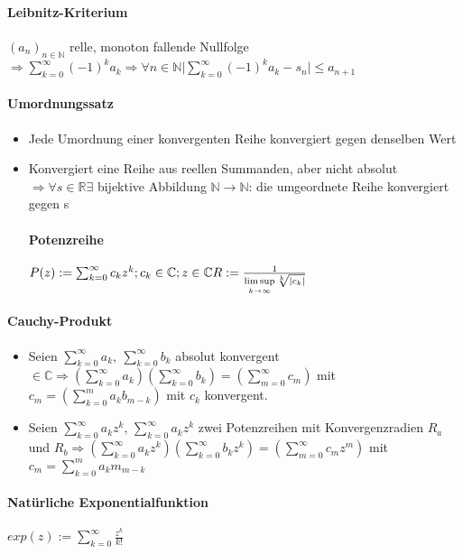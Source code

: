 \documentclass[paper=a4,paper=landscape, fontsize=6pt,DIV=25, twoside]{scrartcl}
\newcommand{\real}{{\mathbb{R}}}
\newcommand{\compl}{\mathbb{C}}
\newcommand{\nat}{\mathbb{N}}
\newcommand{\aseq}{(a_n)_{n \in \nat}}
\begin{document}
\begin{multicols*}{4}
		\paragraph{Leibnitz-Kriterium}
		$\aseq$ relle, monoton fallende Nullfolge $ \Rightarrow \sum_{k=0}^{\infty} (-1)^ka_k \Rightarrow \forall n \in \nat \lvert \sum_{k=0}^{\infty}(-1)^ka_k-s_n \rvert \leq  a_{n+1}$
		\paragraph{Umordnungssatz}\begin{itemize}[noitemsep,nolistsep]
			\item Jede Umordnung einer konvergenten Reihe konvergiert gegen denselben Wert
			\item Konvergiert eine Reihe aus reellen Summanden, aber nicht absolut $\Rightarrow \forall s \in \real \exists$ bijektive Abbildung $\nat \rightarrow \nat$: die umgeordnete Reihe konvergiert gegen s
		\paragraph{Potenzreihe}
		$ P(z) := \sum_{k=0}^{\infty} c_kz^k; c_k \in \compl; z \in \compl\\R := \frac{1}{\limsup\limits_{k \rightarrow \infty} \sqrt[k]{|c_k|}}$
		\end{itemize}
		\paragraph{Cauchy-Produkt}
		\begin{itemize}[noitemsep,nolistsep]
			\item Seien $ \sum_{k=0}^{\infty} a_k,\:\sum_{k=0}^{\infty} b_k$ absolut konvergent $ \in \compl \Rightarrow (\sum_{k=0}^{\infty} a_k) (\sum_{k=0}^{\infty} b_k) = (\sum_{m=0}^{\infty} c_m)$ mit $ c_m=(\sum_{k=0}^{m} a_kb_{m-k})$ mit $c_k$ konvergent.
			\item Seien $ \sum_{k=0}^{\infty} a_kz^k$, $\sum_{k=0}^{\infty} a_kz^k$ zwei Potenzreihen mit Konvergenzradien $R_a$ und $ R_b \Rightarrow (\sum_{k=0}^{\infty} a_kz^k)(\sum_{k=0}^{\infty} b_kz^k)=(\sum_{m=0}^{\infty} c_mz^m)$ mit $ c_m = \sum_{k=0}^{m} a_km_{m-k}$
		\end{itemize}
		\paragraph{Natürliche Exponentialfunktion}
		$ exp(z) := \sum_{k=0}^{\infty} \frac{z^k}{k!}$

\end{multicols*}
\end{document}
